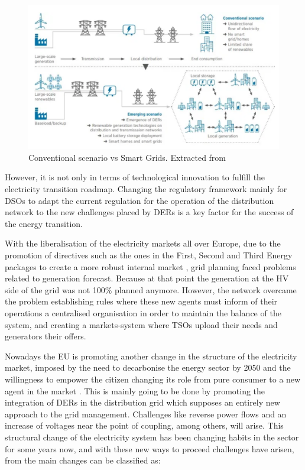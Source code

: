 \begin{figure}[htbp]
	\centering 
	\includegraphics[width=0.9\columnwidth ]{ChapterIntro/Figures/Irena-DSO-1.png}
		\caption{Conventional scenario vs Smart Grids. Extracted from \cite{IRENA2018}}  
		\label{fig:IRENA-DSO}
\end{figure}

However, it is not only in terms of technological innovation to fulfill the electricity transition roadmap. Changing the regulatory framework mainly for DSOs to adapt the current regulation for the operation of the distribution network to the new challenges placed by DERs is a key factor for the success of the energy transition.

With the liberalisation of the electricity markets all over Europe, due to the promotion of directives such as the ones in the First, Second and Third Energy packages \cite{EuropeanCommission2003, EuropeanCommission2009} to create a more robust internal market \cite{Hancher2017, EUPHEMIA2016, antonopoulos2020nodal}, grid planning faced problems related to generation forecast. Because at that point the generation at the HV side of the grid was not 100$\%$ planned anymore. However, the network overcame the problem establishing rules where these new agents must inform of their operations a centralised organisation in order to maintain the balance of the system, and creating a markets-system where TSOs upload their needs and generators their offers. 

Nowadays the EU is promoting another change in the structure of the electricity market, imposed by the need to decarbonise the energy sector by 2050 and the willingness to empower the citizen changing its role from pure consumer to a new agent in the market \cite{Hancher2017}. This is mainly going to be done by promoting the integration of DERs in the distribution grid which supposes an entirely new approach to the grid management. Challenges like reverse power flows and an increase of voltages near the point of coupling, among others, will arise. This structural change of the electricity system has been changing habits in the sector for some years now, and with these new ways to proceed challenges have arisen, from \cite{Bollen2011} the main changes can be classified as:

